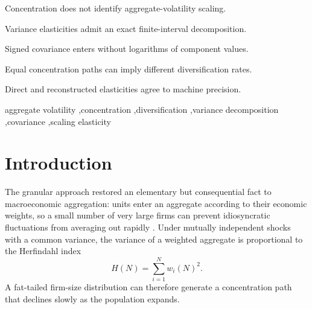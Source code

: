 \documentclass[a4paper,fleqn]{cas-dc}
\begin{document}

\begin{highlights}
\item Concentration does not identify aggregate-volatility scaling.
\item Variance elasticities admit an exact finite-interval decomposition.
\item Signed covariance enters without logarithms of component values.
\item Equal concentration paths can imply different diversification rates.
\item Direct and reconstructed elasticities agree to machine precision.
\end{highlights}


\begin{keywords}
aggregate volatility
\sep concentration
\sep diversification
\sep variance decomposition
\sep covariance
\sep scaling elasticity
\end{keywords}



\maketitle


\section{Introduction}
\label{sec:introduction}

The granular approach restored an elementary but consequential fact to
macroeconomic aggregation: units enter an aggregate according to their
economic weights, so a small number of very large firms can prevent
idiosyncratic fluctuations from averaging out rapidly
\citep{gabaix2011}. Under mutually independent shocks with a common
variance, the variance of a weighted aggregate is proportional to the
Herfindahl index
\begin{equation}
    H(N)=\sum_{i=1}^{N}w_i(N)^2.
\end{equation}
A fat-tailed firm-size distribution can therefore generate a
concentration path that declines slowly as the population expands.
\end{document}
